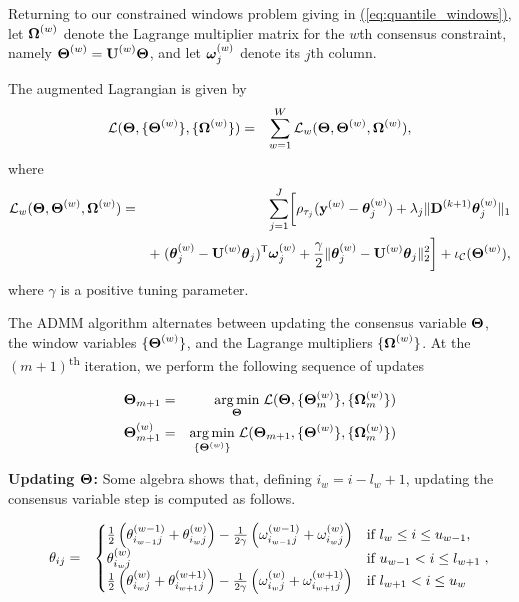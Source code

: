 \documentclass[aoas]{imsart}
\newcommand{\Eqn}[1]{\hyperref[eq:#1]{{\rm (\ref*{eq:#1})}}} %
\newcommand{\Eqn}[1]{{(\ref{eq:#1})}} %
\newcommand{\Tra}{^{\sf T}} %
\newcommand{\V}[1]{{\bm{\mathbf{\MakeLowercase{#1}}}}} %
\newcommand{\Vn}[2]{\V{#1}^{(#2)}} %
\newcommand{\M}[1]{{\bm{\mathbf{\MakeUppercase{#1}}}}} %
\newcommand{\ME}[2]{\MakeLowercase{#1}_{#2}} %
\newcommand{\Mn}[2]{\M{#1}^{(#2)}} %
\newcommand{\MnE}[3]{\MakeLowercase{#1}^{(#2)}_{#3}} %
\begin{document}
Returning to our constrained windows problem giving in \Eqn{quantile_windows}, let $\Mn{\Omega}{w}$ denote the Lagrange multiplier matrix for the $w$th consensus constraint, namely $\Mn{\Theta}{w} = \Mn{U}{w}\M{\Theta}$, and let $\Vn{\omega}{w}_{j}$ denote its $j$th column.

The augmented Lagrangian is given by
\begin{eqnarray*}
	\mathcal{L}(\M{\Theta}, \{\Mn{\Theta}{w}\}, \{\Mn{\Omega}{w}\}) & = & \sum_{w=1}^W \mathcal{L}_w(\M{\Theta}, \Mn{\Theta}{w}, \Mn{\Omega}{w}),
\end{eqnarray*}
where
\begin{eqnarray*}
	\mathcal{L}_w(\M{\Theta}, \Mn{\Theta}{w}, \Mn{\Omega}{w}) & = & \sum_{j=1}^J \biggl [\rho_{\tau_j}(\Vn{y}{w} - \Vn{\theta}{w}_j)+\lambda_j \lVert \Mn{D}{k+1}\Vn{\theta}{w}_j\rVert_1 \\
	&& + \; (\Vn{\theta}{w}_j - \Mn{U}{w}\V{\theta}_{j})\Tra\Vn{\omega}{w}_{j} +
	\frac{\gamma}{2}\lVert \Vn{\theta}{w}_j - \Mn{U}{w}\V{\theta}_{j}\rVert_2^2 \biggr ] + \iota_\mathcal{C}(\Mn{\Theta}{w}),
\end{eqnarray*}
where $\gamma$ is a positive tuning parameter.

The ADMM algorithm alternates between updating the consensus variable $\M{\Theta}$, the window variables $\{\Mn{\Theta}{w}\}$, and the Lagrange multipliers $\{\Mn{\Omega}{w}\}$.
At the $(m+1)$\textsuperscript{th} iteration, we perform the following sequence of updates

\begin{eqnarray*}
	\M{\Theta}_{m+1} & = & \underset{\M{\Theta}}{\arg\min}\; \mathcal{L}(\M{\Theta}, \{\Mn{\Theta}{w}_m\}, \{\Mn{\Omega}{w}_m\}) \\
	\Mn{\Theta}{w}_{m+1} & = & \underset{\{\Mn{\Theta}{w}\}}{\arg\min}\; \mathcal{L}(\M{\Theta}_{m+1}, \{\Mn{\Theta}{w}\}, \{\Mn{\Omega}{w}_m\}) \\
\end{eqnarray*}

{\bf Updating $\M{\Theta}$: } Some algebra shows that,  defining $i_w = i-l_w+1$, updating the consensus variable step is computed as follows.

\begin{align}
\label{eq:update_consensus}
~~~~\ME{\theta}{ij}	 &=& \begin{cases}
\frac{1}{2}\left (\MnE{\theta}{w-1}{i_{w-1}j} + \MnE{\theta}{w}{i_wj} \right)
-
\frac{1}{2\gamma} \left (\MnE{\omega}{w-1}{i_{w-1}j} + \MnE{\omega}{w}{i_{w}j} \right)
& \mbox{if~} l_{w} \le i \le u_{w-1},  \\
\MnE{\theta}{w}{i_{w}j} & \mbox{if~} u_{w-1} < i \le l_{w+1}  \\
\frac{1}{2} \left ( \MnE{\theta}{w}{i_{w}j} + \MnE{\theta}{w+1}{i_{w+1}j} \right )
-
\frac{1}{2\gamma}	\left (\MnE{\omega}{w}{i_{w}j} + \MnE{\omega}{w+1}{i_{w+1}j} \right )
& \mbox{if~} l_{w+1} < i \le u_{w}
\end{cases},
\end{align}
\end{document}
